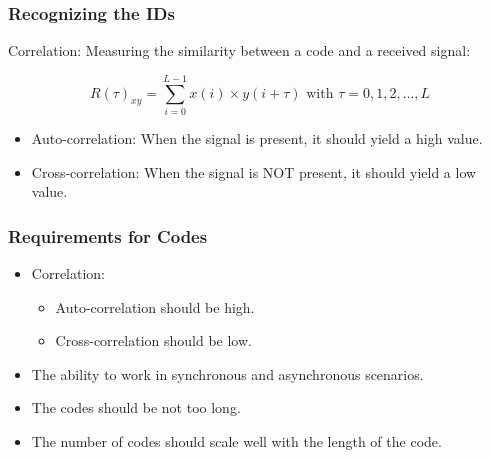 \documentclass{beamer}
\begin{document}
	




	\begin{frame}\frametitle{Recognizing the IDs}
		
		Correlation: Measuring the similarity between a code and a received signal:

		\begin{equation*}
			R(\tau)_{xy} = \displaystyle\sum_{i = 0} ^ {L - 1} x(i) \times y(i + \tau) {\text{  with $\tau = 0, 1, 2, \dotsc, L$}}
		\end{equation*}

		\begin{itemize}

			\item Auto-correlation: When the signal is present, it should yield a high value.

			\item Cross-correlation: When the signal is NOT present, it should yield a low value.

		\end{itemize}
	\end{frame}



	\begin{frame}\frametitle{Requirements for Codes}
		
		\begin{itemize}

			\item Correlation:
			\begin{itemize}

				\item Auto-correlation should be high.

				\item Cross-correlation should be low.

			\end{itemize}

			\item The ability to work in synchronous and asynchronous scenarios.

			\item The codes should be not too long.

			\item The number of codes should scale well with the length of the code. 

		\end{itemize}
		
	\end{frame}
\end{document}
